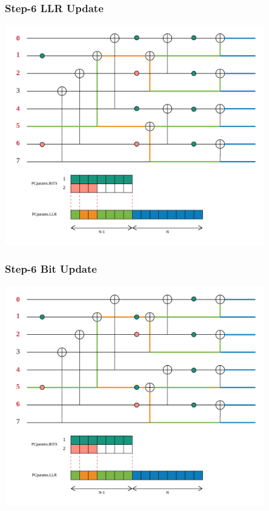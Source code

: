 \documentclass{beamer}
\begin{document}
\begin{frame}
\frametitle{Step-6 LLR Update}
  \begin{center}
  \includegraphics[width=0.85\textwidth]{pics/polar_-_SC_llr_6.png}
  \end{center}
\end{frame}

\begin{frame}
\frametitle{Step-6 Bit Update}
  \begin{center}
  \includegraphics[width=0.85\textwidth]{pics/polar_-_SC_bit_6.png}
  \end{center}
\end{frame}
\end{document}
